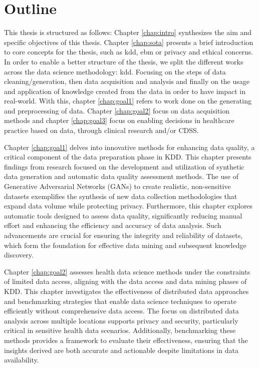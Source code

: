 \chapter*{Outline}



This thesis is structured as follows:
Chapter \ref{chap:intro} synthesizes the aim and specific objectives of this thesis.
Chapter \ref{chap:sota} presents a brief introduction to core concepts for the thesis, such as \ac{kdd}, \ac{ebm} or privacy and ethical concerns.\\
In order to enable a better structure of the thesis, we split the different works across the data science methodology: \ac{kdd}. Focusing on the steps of data cleaning/generation, then data acquisition and analysis and finally on the usage and application of knowledge created from the data in order to have impact in real-world. With this, chapter \ref{chap:goal1} refers to work done on the generating  and preprocessing of data. Chapter \ref{chap:goal2} focus on data acquisition methods and chapter \ref{chap:goal3} focus on enabling decisions in healthcare practice based on data, through clinical research and/or CDSS. 

Chapter \ref{chap:goal1} delves into innovative methods for enhancing data quality, a critical component of the data preparation phase in KDD. This chapter presents findings from research focused on the development and utilization of synthetic data generation and automatic data quality assessment methods. The use of Generative Adversarial Networks (GANs) to create realistic, non-sensitive datasets exemplifies the synthesis of new data collection methodologies that expand data volume while protecting privacy. Furthermore, this chapter explores automatic tools designed to assess data quality, significantly reducing manual effort and enhancing the efficiency and accuracy of data analysis. Such advancements are crucial for ensuring the integrity and reliability of datasets, which form the foundation for effective data mining and subsequent knowledge discovery.

Chapter \ref{chap:goal2} assesses health data science methods under the constraints of limited data access, aligning with the data access and data mining phases of KDD. This chapter investigates the effectiveness of distributed data approaches and benchmarking strategies that enable data science techniques to operate efficiently without comprehensive data access. The focus on distributed data analysis across multiple locations supports privacy and security, particularly critical in sensitive health data scenarios. Additionally, benchmarking these methods provides a framework to evaluate their effectiveness, ensuring that the insights derived are both accurate and actionable despite limitations in data availability.

